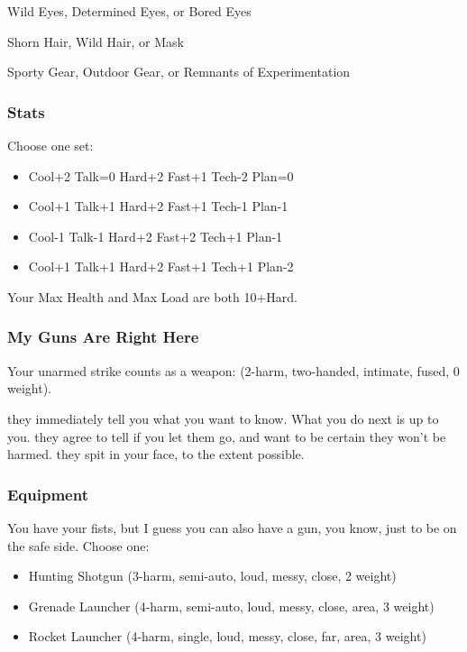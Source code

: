 Wild Eyes, Determined Eyes, or Bored Eyes

Shorn Hair, Wild Hair, or Mask

Sporty Gear, Outdoor Gear, or Remnants of Experimentation

\subsubsection{Stats}
Choose one set:
\begin{itemize}
\setlength\itemsep{0em}
\item Cool+2 Talk=0 Hard+2 Fast+1 Tech-2 Plan=0
\item Cool+1 Talk+1 Hard+2 Fast+1 Tech-1 Plan-1
\item Cool-1 Talk-1 Hard+2 Fast+2 Tech+1 Plan-1
\item Cool+1 Talk+1 Hard+2 Fast+1 Tech+1 Plan-2
\end{itemize}

Your Max Health and Max Load are both 10+Hard.

\subsubsection{My Guns Are Right Here}
Your unarmed strike counts as a weapon: (2-harm, two-handed, intimate, fused, 0 weight).


{they immediately tell you what you want to know. What you do next is up to you.}
{they agree to tell if you let them go, and want to be certain they won't be harmed.}
{they spit in your face, to the extent possible.}


\subsubsection{Equipment}
You have your fists, but I guess you can also have a gun, you know, just to be on the safe side. Choose one:
\begin{itemize}
\item Hunting Shotgun (3-harm, semi-auto, loud, messy, close, 2 weight)
\item Grenade Launcher (4-harm, semi-auto, loud, messy, close, area, 3 weight)
\item Rocket Launcher (4-harm, single, loud, messy, close, far, area, 3 weight)
\end{itemize}

